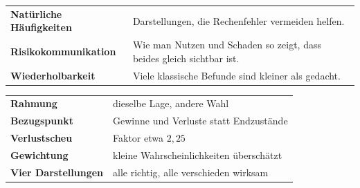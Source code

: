 \begin{forschung}
\begin{center}
{\small
\renewcommand{\arraystretch}{1.45}
\begin{tabular}{@{}P{3.4cm}P{4.8cm}@{}}
\toprule
\textbf{Natürliche Häufig\-keiten} & Darstellungen, die Rechenfehler vermeiden helfen.\\
\textbf{Risikokommuni\-kation} & Wie man Nutzen und Schaden so zeigt, dass beides gleich sichtbar ist.\\
\textbf{Wiederholbarkeit} & Viele klassische Befunde sind kleiner als gedacht.\\
\bottomrule
\end{tabular}}
\end{center}

\begin{center}
\begin{minipage}{0.88\textwidth}
\end{minipage}
\end{center}
\end{forschung}

\begin{merksatz}
\begin{center}
\renewcommand{\arraystretch}{1.5}
\begin{tabular}{@{}P{3.0cm}P{5.6cm}@{}}
\toprule
\textbf{Rahmung} & dieselbe Lage, andere Wahl\\
\textbf{Bezugspunkt} & Gewinne und Verluste statt Endzustände\\
\textbf{Verlustscheu} & Faktor etwa $2{,}25$\\
\textbf{Gewichtung} & kleine Wahrscheinlichkeiten überschätzt\\
\textbf{Vier Darstellungen} & alle richtig, alle verschieden wirksam\\
\bottomrule
\end{tabular}
\end{center}

\begin{center}
\begin{minipage}{0.88\textwidth}
\end{minipage}
\end{center}
\end{merksatz}
